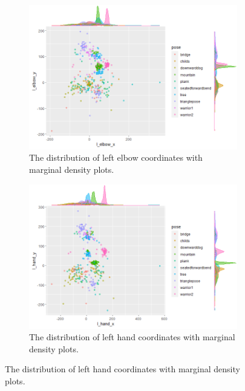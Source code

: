 \documentclass{article}
\begin{document}
\begin{figure}\ContinuedFloat
    \begin{subfigure}[b]{\linewidth}
        \includegraphics[width=0.9\linewidth]{limb-distribution/l_elbow.png}
        \caption{The distribution of left elbow coordinates with marginal density plots.}
        \label{fig: l_elbow}
    \end{subfigure}
    \begin{subfigure}[b]{\linewidth}
        \includegraphics[width=0.9\linewidth]{limb-distribution/l_hand.png}
        \caption{The distribution of left hand coordinates with marginal density plots.}
        \label{fig: l_hand}
    \end{subfigure}
\end{figure}
\end{document}
